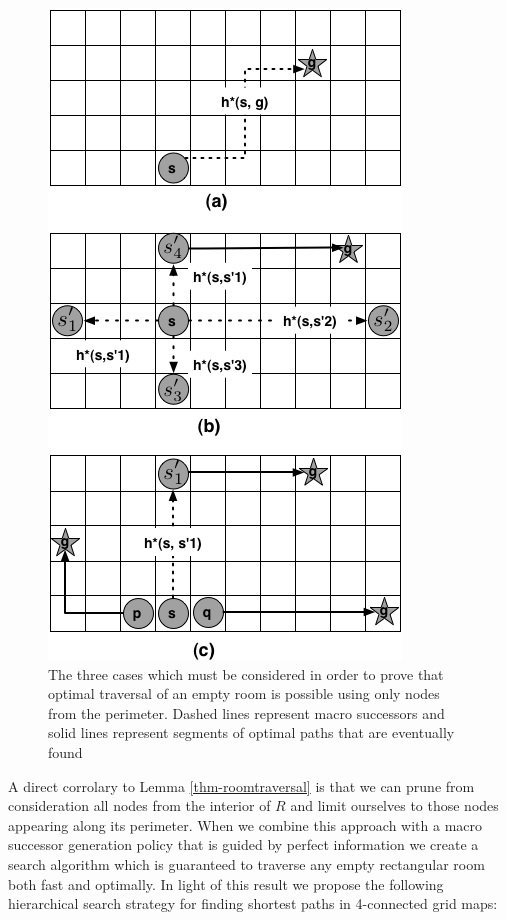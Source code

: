 \begin{figure}[htbp]
	\label{fig-roomtraversal}
	\vspace{-4pt}
       \begin{center}
           \includegraphics[scale=0.50, trim = 10mm 10mm 10mm 0mm]{diagrams/roomtraversal.png}
       \end{center}
	\vspace{-3pt}
       \caption{The three cases which must be considered in order to prove that 
			optimal traversal of an empty room is possible using only nodes from the perimeter.
			Dashed lines represent macro successors and solid lines represent segments of optimal
			paths that are eventually found}
       \label{fig-ohacontrast}
	\vspace{-15pt}
\end{figure}

A direct corrolary to Lemma \ref{thm-roomtraversal} is that we can prune from consideration
all nodes from the interior of $R$ and limit ourselves to those nodes appearing along its perimeter.
When we combine this approach with a macro successor generation policy
that is guided by perfect information we create a search algorithm which is guaranteed to traverse
any empty rectangular room both fast and optimally.
In light of this result we propose the following hierarchical search strategy for finding shortest 
paths in 4-connected grid maps:

